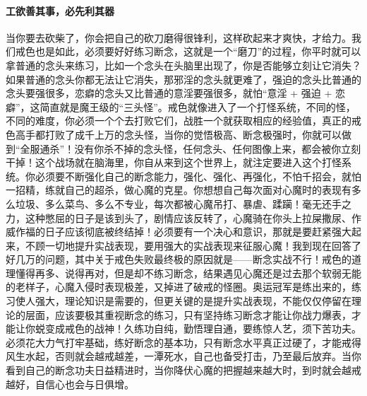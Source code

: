 \paragraph{工欲善其事，必先利其器}

当你要去砍柴了，你会把自己的砍刀磨得很锋利，这样砍起来才爽快，才给力。我们戒色也是如此，必须要好好练习断念，这就是一个“磨刀”的过程，你平时就可以拿普通的念头来练习，比如一个念头在头脑里出现了，你是否能够立刻让它消失？如果普通的念头你都无法让它消失，那邪淫的念头就更难了，强迫的念头比普通的念头要强很多，恋癖的念头又比普通的意淫要强很多，就怕“意淫 + 强迫 + 恋癖”，这简直就是魔王级的“三头怪”。戒色就像进入了一个打怪系统，不同的怪，不同的难度，你必须一个个去打败它们，战胜一个就获取相应的经验值，真正的戒色高手都打败了成千上万的念头怪，当你的觉悟极高、断念极强时，你就可以做到“全服通杀”！没有你杀不掉的念头怪，任何念头、任何图像上来，都会被你立刻干掉！这个战场就在脑海里，你自从来到这个世界上，就注定要进入这个打怪系统。你必须要不断强化自己的断念能力，强化、强化、再强化，不怕千招会，就怕一招精，练就自己的超杀，做心魔的克星。你想想自己每次面对心魔时的表现有多么垃圾、多么菜鸟、多么不专业，每次都被心魔吊打、暴虐、蹂躏！毫无还手之力，这种憋屈的日子是该到头了，剧情应该反转了，心魔骑在你头上拉屎撒尿、作威作福的日子应该彻底被终结掉！必须要有一个决心和意识，那就是要赶紧强大起来，不顾一切地提升实战表现，要用强大的实战表现来征服心魔！我到现在回答了好几万的问题，其中关于戒色失败最终极的原因就是——断念实战不行！戒色的道理懂得再多、说得再对，但是却不练习断念，结果遇见心魔还是过去那个软弱无能的老样子，心魔入侵时表现极差，又掉进了破戒的怪圈。奥运冠军是练出来的，练习使人强大，理论知识是需要的，但更关键的是提升实战表现，不能仅仅停留在理论的层面，应该要极其重视断念的练习，只有坚持练习断念才能让你战力爆表，才能让你蜕变成戒色的战神！久练功自纯，勤悟理自通，要练惊人艺，须下苦功夫。必须花大力气打牢基础，练好断念的基本功，只有断念水平真正过硬了，才能戒得风生水起，否则就会越戒越差，一潭死水，自己也备受打击，乃至最后放弃。当你看到自己的断念功夫日益精进时，当你降伏心魔的把握越来越大时，到时就会越戒越好，自信心也会与日俱增。

